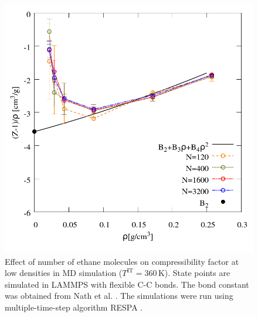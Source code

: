 \documentclass[%
 aip,
 jcp,
 sd,%
 amsmath,amssymb,
 reprint,%
]{revtex4-1}
\begin{document}
\begin{figure}
\includegraphics[scale=0.3]{Figures/FSE_TraPPE-C2_Lammps-flex_IT.png}
\caption{Effect of number of ethane molecules on compressibility factor at low densities in MD simulation ($T^{\mathrm{IT}}=360 \, \mathrm{K}$). State points are simulated in LAMMPS with flexible C-C bonds. The bond constant was obtained from Nath et al.  \cite{Nath1998a}. The simulations were run using multiple-time-step algorithm RESPA \cite{tuckerman1992}. 
}
\label{fig:FSE_TraPPE_C2_Lammps_flex_IT}
\end{figure}
\end{document}
